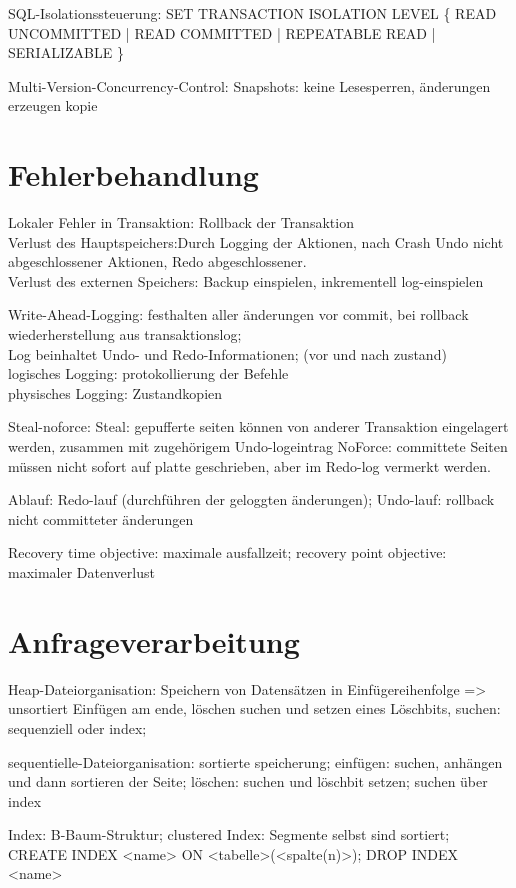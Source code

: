 SQL-Isolationssteuerung: SET TRANSACTION ISOLATION LEVEL \{ READ UNCOMMITTED | READ COMMITTED | REPEATABLE READ | SERIALIZABLE \}

Multi-Version-Concurrency-Control: Snapshots: keine Lesesperren, änderungen erzeugen kopie

\section*{Fehlerbehandlung}
Lokaler Fehler in Transaktion: Rollback der Transaktion\\
Verlust des Hauptspeichers:Durch Logging der Aktionen, nach Crash Undo nicht abgeschlossener Aktionen, Redo abgeschlossener.\\
Verlust des externen Speichers: Backup einspielen, inkrementell log-einspielen

Write-Ahead-Logging: festhalten aller änderungen vor commit, bei rollback wiederherstellung aus transaktionslog;\\
Log beinhaltet Undo- und Redo-Informationen; (vor und nach zustand)\\
logisches Logging: protokollierung der Befehle\\
physisches Logging: Zustandkopien

Steal-noforce:
Steal: gepufferte seiten können von anderer Transaktion eingelagert werden, zusammen mit zugehörigem Undo-logeintrag
NoForce: committete Seiten müssen nicht sofort auf platte geschrieben, aber im Redo-log vermerkt werden.

Ablauf: Redo-lauf (durchführen der geloggten änderungen); Undo-lauf: rollback nicht committeter änderungen

Recovery time objective: maximale ausfallzeit; recovery point objective: maximaler Datenverlust

\section*{Anfrageverarbeitung}
Heap-Dateiorganisation: Speichern von Datensätzen in Einfügereihenfolge => unsortiert
Einfügen am ende, löschen suchen und setzen eines Löschbits, suchen: sequenziell oder index;

sequentielle-Dateiorganisation: sortierte speicherung;
einfügen: suchen, anhängen und dann sortieren der Seite; löschen: suchen und löschbit setzen; suchen über index

Index: B-Baum-Struktur; clustered Index: Segmente selbst sind sortiert;  
CREATE INDEX <name> ON 	<tabelle>(<spalte(n)>); DROP INDEX <name>

